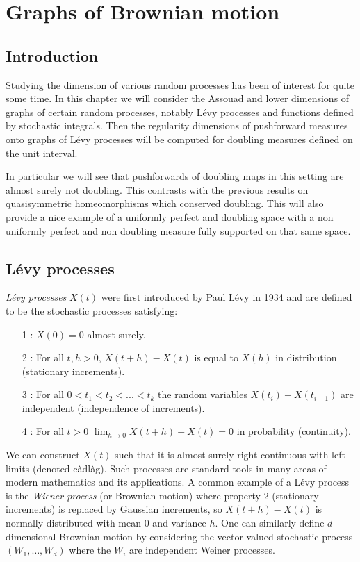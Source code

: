\chapter{Graphs of Brownian motion}
\label{chap:graphs}

\section{Introduction}
\label{sec:intro-brownian}

Studying the dimension of various random processes has been of interest for quite some time. In this chapter we will consider the Assouad and lower dimensions of graphs of certain random processes, notably L\'evy processes and functions defined by stochastic integrals. Then the regularity dimensions of pushforward measures onto graphs of L\'evy processes will be computed for doubling measures defined on the unit interval. 

In particular we will see that pushforwards of doubling maps in this setting are almost surely not doubling. This contrasts with the previous results on quasisymmetric homeomorphisms which conserved doubling. This will also provide a nice example of a uniformly perfect and doubling space with a non uniformly perfect and non doubling measure fully supported on that same space.

\section{L\'evy processes}
\label{sec:levy-process}


\emph{L\'{e}vy processes} $X(t)$ were first introduced by Paul L\'evy in 1934 \cite{levy} and are defined to be the stochastic processes satisfying:
\begin{itemize}
	\item[1]: $X(0)=0$ almost surely.
	\item[2]: For all $t,h>0$, $X(t+h)-X(t)$ is equal to $X(h)$ in distribution (stationary increments).
	\item[3]: For all $0<t_1<t_2<...<t_k$ the random variables $X(t_i)-X(t_{i-1})$ are independent (independence of increments).
	\item[4]: For all $t>0$ $\lim_{h\to 0} X(t+h)-X(t)=0$ in probability (continuity).
\end{itemize}

We can construct $X(t)$ such that it is almost surely right continuous with left limits (denoted c\`adl\`ag). Such processes are standard tools in many areas of modern mathematics and its applications. A common example of a L\'evy process is the \emph{Wiener process} (or Brownian motion) where property 2 (stationary increments) is replaced by Gaussian increments, so $X(t+h)-X(t)$ is normally distributed with mean 0 and variance $h$. One can similarly define $d$-dimensional Brownian motion by considering the vector-valued stochastic process $(W_1,\ldots, W_d)$ where the $W_i$ are independent Weiner processes. 


